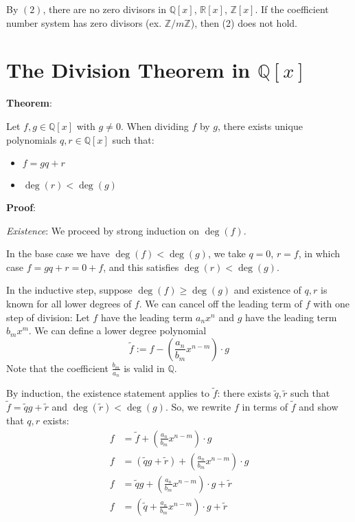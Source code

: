 \documentclass{article}
\begin{document}
\begin{multicols*}{2}
By $(2)$, there are no zero divisors in $\mathbb{Q}[x]$, $\mathbb{R}[x]$, $\mathbb{Z}[x]$. If the coefficient number system has zero divisors (ex. $\mathbb{Z}/m\mathbb{Z}$), then (2) does not hold.

\section{The Division Theorem in $\mathbb{Q}[x]$}

\textbf{Theorem}:

Let $f, g \in \mathbb{Q}[x]$ with $g \neq 0$. When dividing $f$ by $g$, there exists unique polynomials $q, r \in \mathbb{Q}[x]$ such that:
\begin{itemize}
    \item $f = gq + r$
    \item $\deg(r) < \deg(g)$
\end{itemize}

\textbf{Proof}:

\textit{Existence}: We proceed by strong induction on $\deg(f)$. 

In the base case we have $\deg(f) < \deg(g)$, we take $q = 0$, $r = f$, in which case $f = gq + r = 0 + f$, and this satisfies $\deg(r) < \deg(g)$. 

In the inductive step, suppose $\deg(f) \geq \deg(g)$ and existence of $q, r$ is known for all lower degrees of $f$. We can cancel off the leading term of $f$ with one step of division: Let $f$ have the leading term $a_nx^n$ and $g$ have the leading term $b_mx^m$. We can define a lower degree polynomial \[\tilde{f} := f - \left(\frac{a_n}{b_m}x^{n-m}\right) \cdot g\] Note that the coefficient $\frac{b_m}{a_n}$ is valid in $\mathbb{Q}$.

By induction, the existence statement applies to $\tilde{f}$: there exists $\tilde{q}, \tilde{r}$ such that $\tilde{f} = \tilde{q}g + \tilde{r}$ and $\deg(\tilde{r}) < \deg(g)$. So, we rewrite $f$ in terms of $\tilde{f}$ and show that $q, r$ exists:\[\begin{aligned}
    f &= \tilde{f} + \left(\frac{a_n}{b_m}x^{n-m}\right) \cdot g \\
    f &= (\tilde{q}g + \tilde{r}) + \left(\frac{a_n}{b_m}x^{n-m}\right) \cdot g \\
    f &= \tilde{q}g + \left(\frac{a_n}{b_m}x^{n-m}\right) \cdot g + \tilde{r} \\
    f &= \left(\tilde{q} + \frac{a_n}{b_m}x^{n-m}\right) \cdot g + \tilde{r}
\end{aligned}\]


\end{multicols*}
\end{document}
